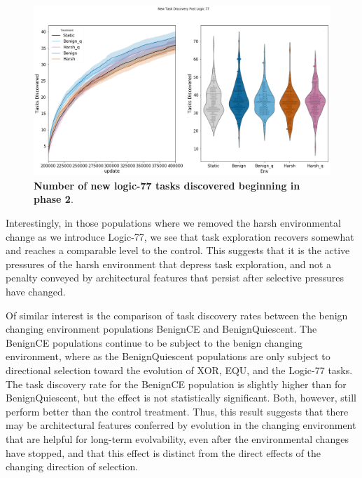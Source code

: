 \documentclass[PhD]{msu-thesis}
\begin{document}
	\begin{figure}[!h]
	\includegraphics[trim={0 0 0 0}, clip, width=0.75\columnwidth]{figures/LTE/lte-simple-post_reward_task_discovery.png}
	\caption{\textbf{Number of new logic-77 tasks discovered beginning in phase 2}.%
	}
	\label{fig:postreward_task_discovery}
	\end{figure} 

Interestingly, in those populations where we removed the harsh environmental change as we introduce Logic-77, we see that task exploration recovers somewhat and reaches a comparable level to the control. This suggests that it is the active pressures of the harsh environment that depress task exploration, and not a penalty conveyed by architectural features that persist after selective pressures have changed.

Of similar interest is the comparison of task discovery rates between the benign changing environment populations BenignCE and BenignQuiescent. The BenignCE populations continue to be subject to the benign changing environment, where as the BenignQuiescent populations are only subject to directional selection toward the evolution of XOR, EQU, and the Logic-77 tasks. The task discovery rate for the BenignCE population is slightly higher than for BenignQuiescent, but the effect is not statistically significant. Both, however, still perform better than the control treatment. Thus, this result suggests that there may be architectural features conferred by evolution in the changing environment that are helpful for long-term evolvability, even after the environmental changes have stopped, and that this effect is distinct from the direct effects of the changing direction of selection. %
\end{document}
